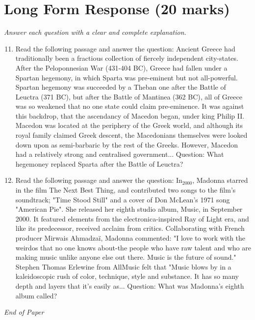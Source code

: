\documentclass[12pt]{article}
\begin{document}
\section*{Long Form Response (20 marks)}
\textit{Answer each question with a clear and complete explanation.}
\begin{enumerate}[label=\arabic*.]
\setcounter{enumi}{10}
\item Read the following passage and answer the question: Ancient Greece had traditionally been a fractious collection of fiercely independent city-states. After the Peloponnesian War (431-404 BC), Greece had fallen under a Spartan hegemony, in which Sparta was pre-eminent but not all-powerful. Spartan hegemony was succeeded by a Theban one after the Battle of Leuctra (371 BC), but after the Battle of Mantinea (362 BC), all of Greece was so weakened that no one state could claim pre-eminence. It was against this backdrop, that the ascendancy of Macedon began, under king Philip II. Macedon was located at the periphery of the Greek world, and although its royal family claimed Greek descent, the Macedonians themselves were looked down upon as semi-barbaric by the rest of the Greeks. However, Macedon had a relatively strong and centralised government... Question: What hegemoney replaced Sparta after the Battle of Leuctra?
\item Read the following passage and answer the question: In$_{2000}$, Madonna starred in the film The Next Best Thing, and contributed two songs to the film's soundtrack; "Time Stood Still" and a cover of Don McLean's 1971 song "American Pie". She released her eighth studio album, Music, in September 2000. It featured elements from the electronica-inspired Ray of Light era, and like its predecessor, received acclaim from critics. Collaborating with French producer Mirwais Ahmadzaï, Madonna commented: "I love to work with the weirdos that no one knows about-the people who have raw talent and who are making music unlike anyone else out there. Music is the future of sound." Stephen Thomas Erlewine from AllMusic felt that "Music blows by in a kaleidoscopic rush of color, technique, style and substance. It has so many depth and layers that it's easily as... Question: What was Madonna's eighth album called?
\end{enumerate}

\vfill
\noindent\textit{End of Paper}
\end{document}
